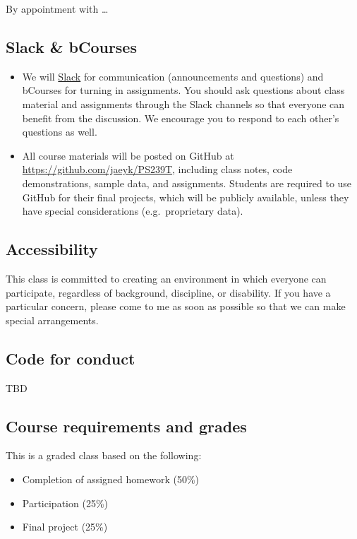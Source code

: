 \documentclass[
]{book}
\providecommand{\tightlist}{%
  \setlength{\itemsep}{0pt}\setlength{\parskip}{0pt}}
\begin{document}
By appointment with \ldots{}

\hypertarget{slack-bcourses}{%
\subsection{Slack \& bCourses}\label{slack-bcourses}}

\begin{itemize}
\item
  We will \href{https://slack.com/}{Slack} for communication (announcements and questions) and bCourses for turning in assignments. You should ask questions about class material and assignments through the Slack channels so that everyone can benefit from the discussion. We encourage you to respond to each other's questions as well.
\item
  All course materials will be posted on GitHub at \url{https://github.com/jaeyk/PS239T}, including class notes, code demonstrations, sample data, and assignments. Students are required to use GitHub for their final projects, which will be publicly available, unless they have special considerations (e.g.~proprietary data).
\end{itemize}

\hypertarget{accessibility}{%
\subsection{Accessibility}\label{accessibility}}

This class is committed to creating an environment in which everyone can participate, regardless of background, discipline, or disability. If you have a particular concern, please come to me as soon as possible so that we can make special arrangements.

\hypertarget{code-for-conduct}{%
\subsection{Code for conduct}\label{code-for-conduct}}

TBD

\hypertarget{course-requirements-and-grades}{%
\subsection{Course requirements and grades}\label{course-requirements-and-grades}}

This is a graded class based on the following:

\begin{itemize}
\tightlist
\item
  Completion of assigned homework (50\%)
\item
  Participation (25\%)
\item
  Final project (25\%)
\end{itemize}
\end{document}
